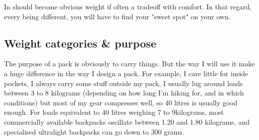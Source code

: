 In should become obvious weight if often a tradeoff with comfort. In that regard, every being different, you will have to find your "sweet spot" on your own.



\subsection{Weight categories \& purpose}

The purpose of a pack is obviously to carry things. But the way I will use it make a huge difference in the way I design a pack. For example, I care little for inside pockets, I always carry some stuff outside my pack, I usually lug around loads between 3 to 8 kilograms (depending on how long I'm hiking for, and in which conditions) but most of my gear compresses well, so 40 litres is usually good enough.
For loads equivalent to 40 litres weighing 7 to 9kilograms, most commercially available backpacks oscillate between 1.20 and 1.80 kilograms, and specialised ultralight backpacks can go down to 300 grams.
